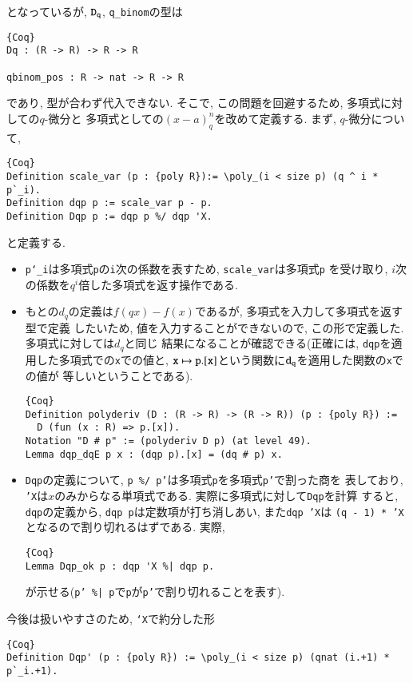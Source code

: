 \documentclass[11pt]{jarticle}
\theoremstyle{mystyle}
\newcommand{\0}{\textbf{0}}
\newcommand{\1}{\textbf{1}}
\newcommand{\2}{\textbf{2}}
\begin{document}
となっているが, ${\tt D}_{\tt q}$, {\tt q\_binom}の型は
\begin{lstlisting}{Coq}
Dq : (R -> R) -> R -> R

qbinom_pos : R -> nat -> R -> R \end{lstlisting}
であり, 型が合わず代入できない. そこで, この問題を回避するため, 多項式に対しての$q$-微分と
多項式としての$(x - a)^n_q$を改めて定義する. まず, $q$-微分について, 
\begin{lstlisting}{Coq}
Definition scale_var (p : {poly R}):= \poly_(i < size p) (q ^ i * p`_i).
Definition dqp p := scale_var p - p.
Definition Dqp p := dqp p %/ dqp 'X.
\end{lstlisting}
と定義する. 
\begin{itemize}
  \item {\tt p`\_i}は多項式{\tt p}の{\tt i}次の係数を表すため, {\tt scale\_var}は多項式{\tt p}
    を受け取り, $i$次の係数を$q^i$倍した多項式を返す操作である.
  \item もとの$d_q$の定義は$f(qx) - f(x)$であるが, 多項式を入力して多項式を返す型で定義
    したいため, 値を入力することができないので, この形で定義した. 多項式に対しては$d_q$と同じ
    結果になることが確認できる(正確には, {\tt dqp}を適用した多項式での{\tt x}での値と, 
    ${\tt x} \mapsto {\tt p.[x]}$という関数に${\tt d}_{\tt q}$を適用した関数の{\tt x}での値が
    等しいということである). 
    \begin{lstlisting}{Coq}
Definition polyderiv (D : (R -> R) -> (R -> R)) (p : {poly R}) :=
  D (fun (x : R) => p.[x]).
Notation "D # p" := (polyderiv D p) (at level 49).
Lemma dqp_dqE p x : (dqp p).[x] = (dq # p) x.
    \end{lstlisting}
  \item {\tt Dqp}の定義について, {\tt p \%/ p'}は多項式{\tt p}を多項式{\tt p'}で割った商を
    表しており, {\tt 'X}は$x$のみからなる単項式である. 実際に多項式に対して{\tt Dqp}を計算
    すると, {\tt dqp}の定義から, {\tt dqp p}は定数項が打ち消しあい, また{\tt dqp 'X}は
    {\tt (q - 1) * 'X}となるので割り切れるはずである. 実際, 
    \begin{lstlisting}{Coq}
Lemma Dqp_ok p : dqp 'X %| dqp p.
    \end{lstlisting}
    が示せる({\tt p' \%| p}で{\tt p}が{\tt p'}で割り切れることを表す). 
\end{itemize}
今後は扱いやすさのため, {\tt `X}で約分した形
\begin{lstlisting}{Coq}
Definition Dqp' (p : {poly R}) := \poly_(i < size p) (qnat (i.+1) * p`_i.+1).
\end{lstlisting}
\end{document}
